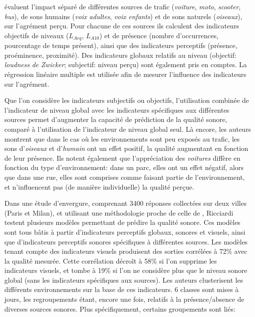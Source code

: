 {{\citep{defreville2004aactivity,lavandier2006contribution} évaluent l'impact séparé de différentes sources de trafic (\emph{voiture}, \emph{moto}, \emph{scooter}, \emph{bus}), de sons humains (\emph{voix adultes}, \emph{voix enfants}) et de sons naturels (\emph{oiseaux}), sur l'agrément perçu. Pour chacune de ces sources ils calculent des indicateurs objectifs de niveaux ($L_{Aeq}$, $L_{A10}$) et de présence (nombre d’occurrences, pourcentage de temps présent), ainsi que des indicateurs perceptifs (présence, proéminence, proximité). Des indicateurs globaux relatifs au niveau (objectif: \emph{loudness de Zwicker}; subjectif: niveau perçu) sont également pris en comptes. La régression linéaire multiple est utilisée afin de mesurer l'influence des indicateurs sur l'agrément.

Que l'on considère les indicateurs subjectifs ou objectifs, l'utilisation combinée de l'indicateur de niveau global avec les  indicateurs spécifiques aux différentes sources permet d'augmenter la capacité de prédiction de la qualité sonore, comparé à l'utilisation de l'indicateur de niveau global seul. Là encore, les auteurs montrent que dans le cas où les environnements sont peu exposés au trafic, les sons d'\emph{oiseaux} et d'\emph{humain} ont un effet positif, la qualité augmentant en fonction de leur présence. Ils notent également que l'appréciation des \emph{voitures} diffère en fonction du type d'environnement: dans un parc, elles ont un effet négatif, alors que dans une rue, elles sont comprises comme faisant partie de l'environnement, et n'influencent pas (de manière individuelle) la qualité perçue.

Dans une étude d'envergure, comprenant 3400 réponses collectées sur deux villes (Paris et Milan), et utilisant une méthodologie proche de celle de \citep{lavandier2006contribution}, Ricciardi~\al \citep{ricciardi2015sound} testent plusieurs modèles permettant de prédire la qualité sonore. Ces modèles sont tous bâtis à partir d'indicateurs perceptifs globaux, sonores et visuels, ainsi que d'indicateurs perceptifs sonores spécifiques à différentes sources. Les modèles tenant compte des indicateurs visuels produisent des sorties corrélées à 72\% avec la qualité mesurée. Cette corrélation décroît à 58\% si l'on supprime les indicateurs visuels, et tombe à 19\% si l'on ne considère plus que le niveau sonore global (sans les indicateurs spécifiques aux sources). Les auteurs clusterisent les différents environnements sur la base de ces indicateurs. 6 classes sont mises à jours, les regroupements étant, encore une fois, relatifs à la présence/absence de diverses sources sonores. Plus spécifiquement, certains groupements sont liés:

}}
